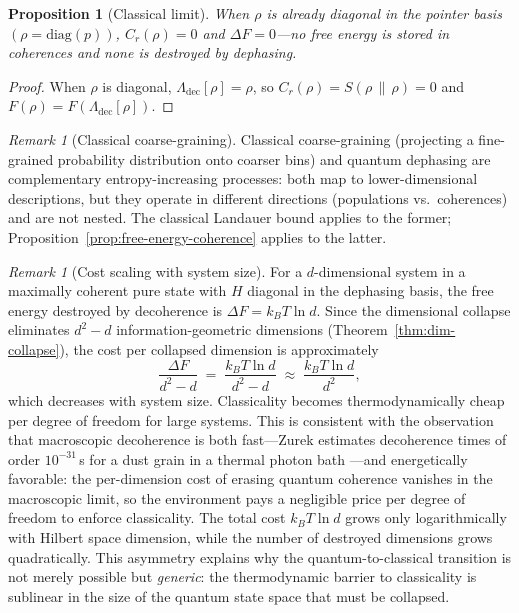 \documentclass[12pt,a4paper]{article}
\newtheorem{proposition}[theorem]{Proposition}
\theoremstyle{definition}
\theoremstyle{remark}
\newtheorem{remark}[theorem]{Remark}
\begin{document}
\begin{proposition}[Classical limit]
\label{prop:classical-limit}
When $\rho$ is already diagonal in the pointer basis $(\rho = \mathrm{diag}(p))$, $C_r(\rho) = 0$ and $\Delta F = 0$---no free energy is stored in coherences and none is destroyed by dephasing.
\end{proposition}

\begin{proof}
When $\rho$ is diagonal, $\Lambda_{\mathrm{dec}}[\rho] = \rho$, so $C_r(\rho) = S(\rho \,\|\, \rho) = 0$ and $F(\rho) = F(\Lambda_{\mathrm{dec}}[\rho])$.
\end{proof}

\begin{remark}[Classical coarse-graining]
\label{rem:classical-coarse-graining}
Classical coarse-graining (projecting a fine-grained probability distribution onto coarser bins) and quantum dephasing are complementary entropy-increasing processes: both map to lower-dimensional descriptions, but they operate in different directions (populations vs.\ coherences) and are not nested.  The classical Landauer bound \cite{landauer1961irreversibility,bennett1982thermodynamics} applies to the former; Proposition~\ref{prop:free-energy-coherence} applies to the latter.
\end{remark}

\begin{remark}[Cost scaling with system size]
\label{rem:cost-scaling}
For a $d$-dimensional system in a maximally coherent pure state with $H$ diagonal in the dephasing basis, the free energy destroyed by decoherence is $\Delta F = k_B T \ln d$.  Since the dimensional collapse eliminates $d^2 - d$ information-geometric dimensions (Theorem~\ref{thm:dim-collapse}), the cost per collapsed dimension is approximately
\begin{equation}
\label{eq:cost-per-dim}
\frac{\Delta F}{d^2 - d} \;=\; \frac{k_B T \ln d}{d^2 - d} \;\approx\; \frac{k_B T \ln d}{d^2},
\end{equation}
which decreases with system size.  Classicality becomes thermodynamically cheap per degree of freedom for large systems.  This is consistent with the observation that macroscopic decoherence is both fast---Zurek estimates decoherence times of order $10^{-31}$\,s for a dust grain in a thermal photon bath \cite{zurek2003decoherence}---and energetically favorable: the per-dimension cost of erasing quantum coherence vanishes in the macroscopic limit, so the environment pays a negligible price per degree of freedom to enforce classicality.  The total cost $k_B T \ln d$ grows only logarithmically with Hilbert space dimension, while the number of destroyed dimensions grows quadratically.  This asymmetry explains why the quantum-to-classical transition is not merely possible but \emph{generic}: the thermodynamic barrier to classicality is sublinear in the size of the quantum state space that must be collapsed.
\end{remark}
\end{document}
